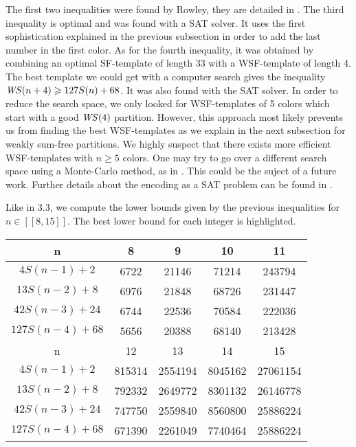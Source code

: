 The first two inequalities were found by Rowley, they are detailed in \cite{RowleyWS}. The third inequality is optimal and was found with a SAT solver.
It uses the first sophistication explained in the previous subsection in order to add the last number in the first color.
As for the fourth inequality, it was obtained by combining an optimal SF-template of length 33 with a WSF-template of length 4.
The best template we could get with a computer search gives the inequality \(\mathit{WS}(n+4) \geqslant 127 S(n) + 68\).
It was also found with the SAT solver. In order to reduce the search space, we only looked for WSF-templates of
5 colors which start with a good \(\mathit{WS}(4)\) partition. However, this approach most likely prevents us from finding the best WSF-templates
as we explain in the next subsection for weakly sum-free partitions. We highly suspect that there exists more efficient WSF-templates
with \(n \geqslant 5\) colors. One may try to go over a different search space using a Monte-Carlo method, as in \cite{Bouzy2015AnAP}.
This could be the suject of a future work. Further details about the encoding as a SAT problem can be found in \cite{Heule2017}.

Like in 3.3, we compute the lower bounds given by the previous inequalities for \( n \in [\![8,15]\!] \). The best lower bound
for each integer is highlighted.

\begin{center}
\begin{tabular}{|*{5}{c|}}
    \hline
	n & 8 & 9 & 10 & 11 \\
	\hline
	\(4S(n-1) + 2 \) & 6722 & 21146 & \cellcolor{yellow} 71214 & \cellcolor{yellow} 243794\\
	\hline
	\(13S(n-2) + 8 \) & \cellcolor{yellow} 6976 & 21848 & 68726 & 231447\\
	\hline
	\(42S(n-3) + 24 \) & 6744 & \cellcolor{yellow} 22536 & 70584 & 222036 \\
	\hline
	\(127S(n-4) + 68 \) & 5656 & 20388 & 68140 & 213428\\
	\hline
	\hline
	n & 12 & 13 & 14 & 15 \\
	\hline
	\(4S(n-1) + 2 \) & \cellcolor{yellow} 815314 & 2554194 & 8045162 & \cellcolor{yellow} 27061154\\
	\hline
	\(13S(n-2) + 8 \) & 792332 & \cellcolor{yellow}2649772 & 8301132 & 26146778 \\
	\hline
	\(42S(n-3) + 24 \) & 747750 & 2559840 & \cellcolor{yellow} 8560800 &  25886224 \\
	\hline
	\(127S(n-4) + 68 \) & 671390 & 2261049 & 7740464 & 25886224 \\
	\hline
\end{tabular}
\end{center}

